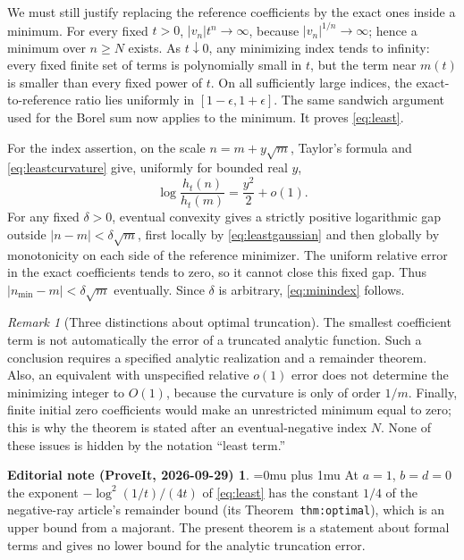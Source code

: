 \documentclass[11pt,a4paper]{article}
\numberwithin{equation}{section}
\theoremstyle{definition}\newtheorem{definition}[theorem]{Definition}
\theoremstyle{remark}\newtheorem{remark}[theorem]{Remark}
\theoremstyle{definition}
\newtheorem*{ednoteinner}{Editorial note (ProveIt, 2026-09-29)}
\newenvironment{ednote}{\begin{ednoteinner}\sloppy\Urlmuskip=0mu plus 1mu\relax}{\end{ednoteinner}}
\newcommand{\abs}[1]{\left|#1\right|}
\begin{document}
We must still justify replacing the reference coefficients by the exact
ones inside a minimum. For every fixed \(t>0\),
\(|v_n|t^n\to\infty\), because \(|v_n|^{1/n}\to\infty\); hence a
minimum over \(n\ge N\) exists. As \(t\downarrow0\), any minimizing
index tends to infinity: every fixed finite set of terms is polynomially
small in \(t\), but the term near \(m(t)\) is smaller than every fixed
power of \(t\). On all sufficiently large indices, the exact-to-reference
ratio lies uniformly in \([1-\epsilon,1+\epsilon]\). The same sandwich
argument used for the Borel sum now applies to the minimum. It proves
\eqref{eq:least}.

For the index assertion, on the scale \(n=m+y\sqrt m\), Taylor's formula
and \eqref{eq:leastcurvature} give, uniformly for bounded real \(y\),
\begin{equation}
 \log\frac{h_t(n)}{h_t(m)}=\frac{y^2}{2}+o(1).
 \label{eq:leastgaussian}
\end{equation}
For any fixed \(\delta>0\), eventual convexity gives a strictly positive
logarithmic gap outside \(\abs{n-m}<\delta\sqrt m\), first locally by
\eqref{eq:leastgaussian} and then globally by monotonicity on each side
of the reference minimizer. The uniform relative error in the exact
coefficients tends to zero, so it cannot close this fixed gap. Thus
\(\abs{n_{\min}-m}<\delta\sqrt m\) eventually. Since \(\delta\) is
arbitrary, \eqref{eq:minindex} follows.

\begin{remark}[Three distinctions about optimal truncation]
The smallest coefficient term is not automatically the error of a truncated
analytic function. Such a conclusion requires a specified analytic
realization and a remainder theorem. Also, an equivalent with unspecified
relative \(o(1)\) error does not determine the minimizing integer to
\(O(1)\), because the curvature is only of order \(1/m\). Finally,
finite initial zero coefficients would make an unrestricted minimum equal
to zero; this is why the theorem is stated after an eventual-negative index
\(N\). None of these issues is hidden by the notation ``least term.''
\end{remark}

\begin{ednote}
At \(a=1\), \(b=d=0\) the exponent \(-\log^2(1/t)/(4t)\) of
\eqref{eq:least} has the constant \(1/4\) of the negative-ray article's
remainder bound \cite{ed:nrs} (its Theorem~\texttt{thm:optimal}), which is
an upper bound from a majorant. The present theorem is a statement about
formal terms and gives no lower bound for the analytic truncation error.
\end{ednote}
\end{document}
